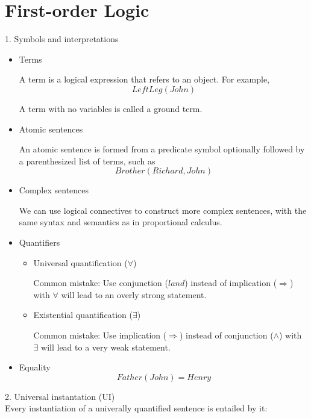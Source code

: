 \documentclass[12pt]{article}
\begin{document}
\section*{First-order Logic}

1. Symbols and interpretations

\begin{itemize}
  \item Terms

    A term is a logical expression that refers to an object. For example,
    \begin{equation*}
      LeftLeg(John)
    \end{equation*}

    A term with no variables is called a ground term.
  \item Atomic sentences

    An atomic sentence is formed from a predicate symbol optionally followed by a parenthesized list of terms, such as
    \begin{equation*}
      Brother(Richard, John)
    \end{equation*}
  \item Complex sentences

    We can use logical connectives to construct more complex sentences, with the same syntax and semantics as in proportional calculus.
  \item Quantifiers
    \begin{itemize}
      \item Universal quantification ($\forall$)

        Common mistake: Use conjunction ($land$) instead of implication ($\Rightarrow$) with $\forall$ will lead to an overly strong statement.
      \item Existential quantification ($\exists$)

        Common mistake: Use implication ($\Rightarrow$) instead of conjunction ($\land$) with $\exists$ will lead to a very weak statement.
    \end{itemize}
  \item Equality
    \begin{equation*}
      Father(John) = Henry
    \end{equation*}
\end{itemize}

2. Universal instantation (UI) \\

Every instantiation of a univerally quantified sentence is entailed by it:
\end{document}
